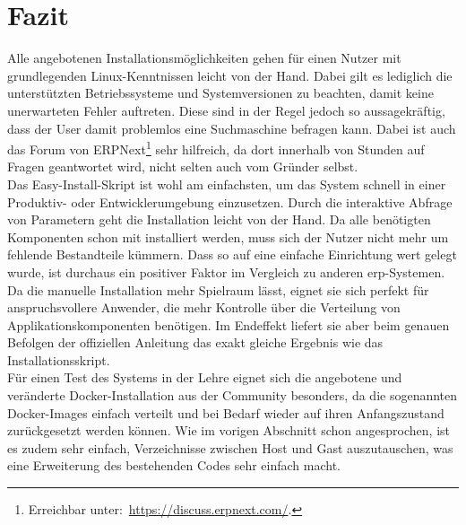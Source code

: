 \section{Fazit}
Alle angebotenen Installationsmöglichkeiten gehen für einen Nutzer mit grundlegenden Linux-Kenntnissen leicht von der Hand. Dabei gilt es lediglich die unterstützten Betriebssysteme und Systemversionen zu beachten, damit keine unerwarteten Fehler auftreten. Diese sind in der Regel jedoch so aussagekräftig, dass der User damit problemlos eine Suchmaschine befragen kann. Dabei ist auch das Forum von ERPNext\footnote{Erreichbar unter:\ \url{https://discuss.erpnext.com/}.} sehr hilfreich, da dort innerhalb von Stunden auf Fragen geantwortet wird, nicht selten auch vom Gründer selbst.\\
Das Easy-Install-Skript ist wohl am einfachsten, um das System schnell in einer Produktiv- oder Entwicklerumgebung einzusetzen. Durch die interaktive Abfrage von Parametern geht die Installation leicht von der Hand. Da alle benötigten Komponenten schon mit installiert werden, muss sich der Nutzer nicht mehr um fehlende Bestandteile kümmern. Dass so auf eine einfache Einrichtung wert gelegt wurde, ist durchaus ein positiver Faktor im Vergleich zu anderen \gls{erp}-Systemen.\\
Da die manuelle Installation mehr Spielraum lässt, eignet sie sich perfekt für anspruchsvollere Anwender, die mehr Kontrolle über die Verteilung von Applikationskomponenten benötigen. Im Endeffekt liefert sie aber beim genauen Befolgen der offiziellen Anleitung das exakt gleiche Ergebnis wie das Installationsskript.\\
Für einen Test des Systems in der Lehre eignet sich die angebotene und veränderte Docker-Installation aus der Community besonders, da die sogenannten Docker-Images einfach verteilt und bei Bedarf wieder auf ihren Anfangszustand zurückgesetzt werden können. Wie im vorigen Abschnitt schon angesprochen, ist es zudem sehr einfach, Verzeichnisse zwischen Host und Gast auszutauschen, was eine Erweiterung des bestehenden Codes sehr einfach macht.